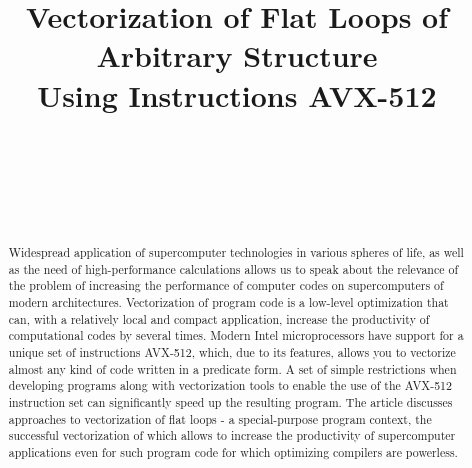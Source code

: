 \documentclass[
11pt,%
tightenlines,%
twoside,%
onecolumn,%
nofloats,%
nobibnotes,%
nofootinbib,%
superscriptaddress,%
noshowpacs,%
centertags]%
{revtex4}
\begin{document}

\title{Vectorization of Flat Loops of Arbitrary Structure\\Using Instructions AVX-512}

\author{~}

\author{~}

\author{~}



\begin{abstract}
Widespread application of supercomputer technologies in various spheres of life, as well as the need of high-performance calculations allows us to speak about the relevance of the problem of increasing the performance of computer codes on supercomputers of modern architectures.
Vectorization of program code is a low-level optimization that can, with a relatively local and compact application, increase the productivity of computational codes by several times.
Modern Intel microprocessors have support for a unique set of instructions AVX-512, which, due to its features, allows you to vectorize almost any kind of code written in a predicate form.
A set of simple restrictions when developing programs along with vectorization tools to enable the use of the AVX-512 instruction set can significantly speed up the resulting program.
The article discusses approaches to vectorization of flat loops - a special-purpose program context, the successful vectorization of which allows to increase the productivity of supercomputer applications even for such program code for which optimizing compilers are powerless.
\end{abstract}
\end{document}

